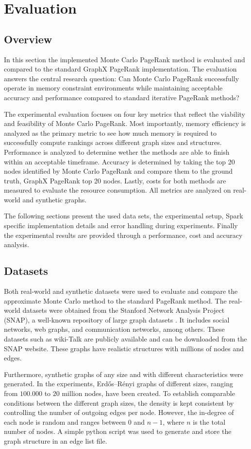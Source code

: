 \section{Evaluation}

\subsection{Overview}
In this section the implemented Monte Carlo PageRank method is evaluated and compared to the standard GraphX PageRank implementation. The evaluation answers the central research question: Can Monte Carlo PageRank successfully operate in memory constraint environments while maintaining acceptable accuracy and performance compared to standard iterative PageRank methods? \par

The experimental evaluation focuses on four key metrics that reflect the viability and feasibility of Monte Carlo PageRank. Most importantly, memory efficiency is analyzed as the primary metric to see how much memory is required to successfully compute rankings across different graph sizes and structures. Performance is analyzed to determine wether the methods are able to finish within an acceptable timeframe. Accuracy is determined by taking the top 20 nodes identified by Monte Carlo PageRank and compare them to the ground truth, GraphX PageRank top 20 nodes. Lastly, costs for both methods are measured to evaluate the resource consumption. All metrics are analyzed on real-world and synthetic graphs.\par

The following sections present the used data sets, the experimental setup, Spark specific implementation details and error handling during experiments. Finally the experimental results are provided through a performance, cost and accuracy analysis.  


\subsection{Datasets}
 Both real-world and synthetic datasets were used to evaluate and compare the approximate Monte Carlo method to the standard PageRank method. The real-world datasets were obtained from the Stanford Network Analysis Project (SNAP), a well-known repository of large graph datasets \cite{standford_university_snap_2025}. It includes social networks, web graphs, and communication networks, among others. These datasets such as wiki-Talk are publicly available and can be downloaded from the SNAP website. These graphs have realistic structures with millions of nodes and edges. \par
Furthermore, synthetic graphs of any size and with different characteristics were generated. In the experiments, Erdős–Rényi graphs of different sizes, ranging from $100.000$ to $20$ million nodes, have been created. To establish comparable conditions between the different graph sizes, the density is kept consistent by controlling the number of outgoing edges per node. However, the in-degree of each node is random and ranges between $0$ and $n-1$, where $n$ is the total number of nodes. A simple python script was used to generate and store the graph structure in an edge list file.

